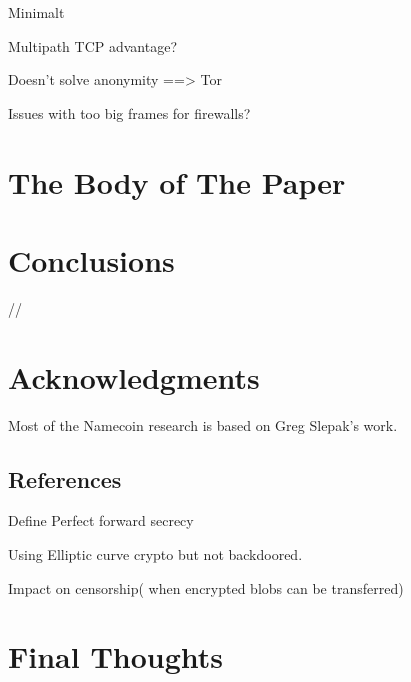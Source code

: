 \documentclass{vldb}
\begin{document}
Minimalt  

Multipath TCP advantage?

Doesn't solve anonymity ==> Tor

Issues with too big frames for firewalls?
\section{The {\secit Body} of The Paper}


\section{Conclusions}

//\balance

\section{Acknowledgments}
Most of the Namecoin research is based on Greg Slepak's work.


\subsection{References}

\begin{appendix}
Define Perfect forward secrecy

Using Elliptic curve crypto but not backdoored.

Impact on censorship( when encrypted blobs can be transferred)
\section{Final Thoughts}

\end{appendix}
\end{document}
